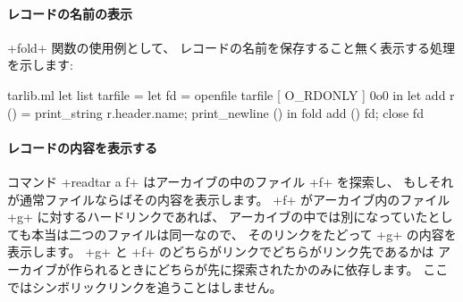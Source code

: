\paragraph{レコードの名前の表示}
\ml+fold+ 関数の使用例として、
レコードの名前を保存すること無く表示する処理を示します:
\begin{listingcodefile}{tarlib.ml}
let list tarfile =
  let fd = openfile tarfile [ O_RDONLY ] 0o0 in
  let add r () = print_string r.header.name; print_newline () in
  fold add () fd;
  close fd
\end{listingcodefile}

\paragraph{レコードの内容を表示する}
コマンド \ml+readtar a f+ はアーカイブの中のファイル \ml+f+ を探索し、
もしそれが通常ファイルならばその内容を表示します。
\ml+f+ がアーカイブ内のファイル \ml+g+ に対するハードリンクであれば、
アーカイブの中では別になっていたとしても本当は二つのファイルは同一なので、
そのリンクをたどって \ml+g+ の内容を表示します。
\ml+g+ と \ml+f+ のどちらがリンクでどちらがリンク先であるかは
アーカイブが作られるときにどちらが先に探索されたかのみに依存します。
ここではシンボリックリンクを追うことはしません。


